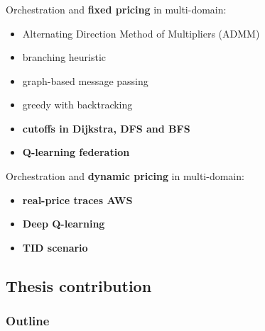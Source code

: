 \documentclass[aspectratio=169]{beamer}
\begin{document}
\begin{frame}
    \frametitle{\secname}
    \framesubtitle{\subsecname}



    Orchestration and \textbf{fixed pricing} in multi-domain:
    \begin{itemize}
        \item Alternating Direction Method of Multipliers (ADMM)~\cite{ad3Distributed}
        \item branching heuristic~\cite{consolidation}
        \item graph-based message passing~\cite{vertex-centric}
        \item greedy with backtracking~\cite{balazsEmbedding} \pause
        \item \textbf{\color{red}cutoffs in Dijkstra, DFS and BFS~\cite{multi-domain-msc}}
        \item \textbf{\color{red}Q-learning federation~\cite{icc}}
    \end{itemize} \pause
    Orchestration and \textbf{\color{red}dynamic pricing} in multi-domain: \pause
    \begin{itemize}
        \item \textbf{\color{red}real-price traces AWS}\pause
        \item \textbf{\color{red}Deep Q-learning}\pause
        \item \textbf{\color{red}TID scenario}
    \end{itemize}
\end{frame}



\subsection{Thesis contribution}
\begin{frame}
    \frametitle{Outline}
    \tableofcontents[subsectionstyle=show/shaded/hide,sectionstyle=show/shaded]
\end{frame}
\end{document}
